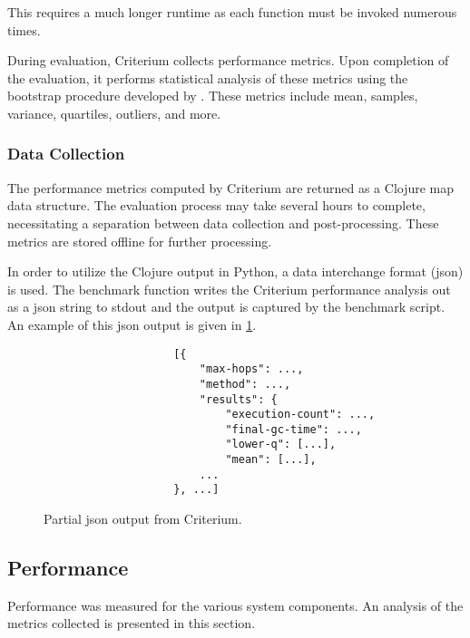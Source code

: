 			This requires a much longer runtime as each function must be invoked numerous times.
			
			During evaluation, Criterium collects performance metrics.  Upon completion of the evaluation, it performs statistical analysis of these metrics using the bootstrap procedure developed by \citeauthor{efron-87} \cite{efron-87}.  These metrics include mean, samples, variance, quartiles, outliers, and more.
		
			\subsubsection{Data Collection}
			\label{sec:data-collection}
				The performance metrics computed by Criterium are returned as a Clojure map data structure.  The evaluation process may take several hours to complete, necessitating a separation between data collection and post-processing.  These metrics are stored offline for further processing.
				
				In order to utilize the Clojure output in Python, a data interchange format (\gls{json}) is used.  The benchmark function writes the Criterium performance analysis out as a \gls{json} string to stdout and the output is captured by the benchmark script.  An example of this \gls{json} output is given in \cref{fig:criterium-json-output}.
				
				\begin{figure}[H]
					\centering %
					\begin{verbatim}
                    [{
                        "max-hops": ...,
                        "method": ...,
                        "results": {
                            "execution-count": ...,
                            "final-gc-time": ...,
                            "lower-q": [...],
                            "mean": [...],
                        ...
                    }, ...]
					\end{verbatim}
					
					\caption{Partial \gls{json} output from Criterium.}
					\label{fig:criterium-json-output}
				\end{figure}
		
		\subsection{Performance}
		\label{sec:performance}
			Performance was measured for the various system components.  An analysis of the metrics collected is presented in this section.
			
